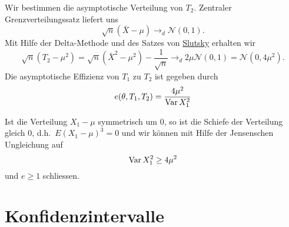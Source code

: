 Wir bestimmen die asymptotische Verteilung von $T_2$. Zentraler Grenzverteilungssatz liefert uns
\begin{equation}
    \sqrt{n}\left( \bar X - \mu \right) \to_d \mathcal N(0,1).
\end{equation}
Mit Hilfe der Delta-Methode und des Satzes von
\href{http://books.google.de/books?id=6anRT6Cz5GAC&lpg=PA101&dq=Slutsky's%20theorem&hl=de&pg=PA101#v=onepage&q&f=false}{Slutsky}
erhalten wir
\begin{equation}
    \sqrt{n}\left( T_2 - \mu^2 \right) =
    \sqrt{n}\left( {\bar X}^2 - \mu^2 \right) - \frac{1}{\sqrt{n}} \to_d 
    2\mu \mathcal N(0,1) = \mathcal N(0, 4\mu^2).
\end{equation}
Die asymptotische Effizienz von $T_1$ zu $T_2$ ist gegeben durch
\begin{equation}
    e(\theta, T_1, T_2) = \frac{4\mu^2}{\operatorname{Var} X_1^2}
\end{equation}

Ist die Verteilung $X_1 - \mu$ symmetrisch um $0$, so ist die Schiefe der Verteilung
gleich $0$, d.h.\ $E \left( X_1 -\mu \right)^3=0$ und wir können mit Hilfe der
Jensenschen Ungleichung auf
\begin{equation}
    \operatorname{Var} X_1^2 \geq 4 \mu^2
\end{equation}
und $e\geq 1$ schliessen.






\section{Konfidenzintervalle}

